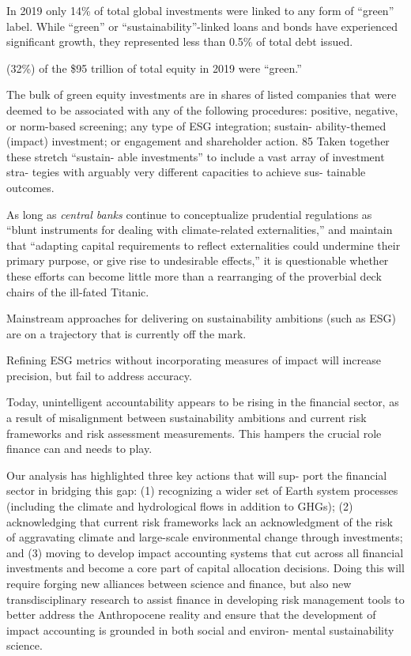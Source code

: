 \documentclass[
]{book}
\begin{document}
In 2019 only 14\% of total global investments were linked to any form of ``green'' label.
While ``green'' or ``sustainability''-linked loans and bonds
have experienced significant growth, they represented less
than 0.5\% of total debt issued.

(32\%) of the \$95 trillion of total equity in 2019 were ``green.''

The bulk of green equity investments are in shares of
listed companies that were deemed to be associated with
any of the following procedures: positive, negative, or
norm-based screening; any type of ESG integration; sustain-
ability-themed (impact) investment; or engagement and
shareholder action. 85 Taken together these stretch ``sustain-
able investments'' to include a vast array of investment stra-
tegies with arguably very different capacities to achieve sus-
tainable outcomes.

As long as \emph{central banks} continue to
conceptualize prudential regulations as ``blunt instruments for
dealing with climate-related externalities,'' and maintain that
``adapting capital requirements to reflect externalities could
undermine their primary purpose, or give rise to undesirable
effects,'' it is questionable whether these efforts can become
little more than a rearranging of the proverbial deck chairs of
the ill-fated Titanic.

Mainstream approaches for delivering on sustainability ambitions (such as
ESG) are on a trajectory that is currently off the mark.

Refining ESG metrics without incorporating measures of impact
will increase precision, but fail to address accuracy.

Today, unintelligent
accountability appears to be rising in the financial sector, as a
result of misalignment between sustainability ambitions and current
risk frameworks and risk assessment measurements. This
hampers the crucial role finance can and needs to play.

Our analysis has highlighted three key actions that will sup-
port the financial sector in bridging this gap: (1) recognizing a
wider set of Earth system processes (including the climate
and hydrological flows in addition to GHGs); (2) acknowledging
that current risk frameworks lack an acknowledgment of the
risk of aggravating climate and large-scale environmental
change through investments; and (3) moving to develop impact
accounting systems that cut across all financial investments
and become a core part of capital allocation decisions. Doing
this will require forging new alliances between science and
finance, but also new transdisciplinary research to assist
finance in developing risk management tools to better address
the Anthropocene reality and ensure that the development of
impact accounting is grounded in both social and environ-
mental sustainability science.
\end{document}
